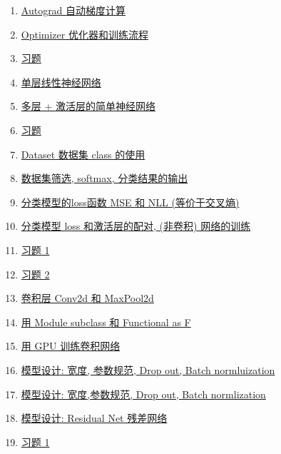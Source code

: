 \documentclass[11pt]{article}
\begin{document}
\begin{multicols}{2}
\begin{enumerate}
		\item \href{https://mp.weixin.qq.com/s/1araRBCpR6tGiV4cWTM2bA}{Autograd 自动梯度计算}	%
		\item \href{https://mp.weixin.qq.com/s/qNmnJ3EGPrczZNNZTH6yJQ}{Optimizer 优化器和训练流程}	%
		\item \href{https://mp.weixin.qq.com/s/7G8jrxUq-aMI7K3qTrD03A}{习题}	%
		\item \href{https://mp.weixin.qq.com/s/SEPqSD9W3HnEeuU6IcxQYQ}{单层线性神经网络}	%
		\item \href{https://mp.weixin.qq.com/s/0DHIJdzxWAgtusqxZqeg2g}{多层 + 激活层的简单神经网络}	%
		\item \href{https://mp.weixin.qq.com/s/2V68bVVr7Gi05LqOdHgsOw}{习题}	%
		\item \href{https://mp.weixin.qq.com/s/wcKFTXTyU9szEacaLhGOVw}{Dataset 数据集 class 的使用}	%
		\item \href{https://mp.weixin.qq.com/s/tpRiT0r6xMwzXLdo767r3g}{数据集筛选, softmax, 分类结果的输出}	%
		\item \href{https://mp.weixin.qq.com/s/BMEFM9wVRWp-maQJ7_6yTw}{分类模型的loss函数 MSE 和 NLL (等价于交叉熵) }	%
		\item \href{https://mp.weixin.qq.com/s/mZNcLjRIGuRSrwCxOIQYXg}{分类模型 loss 和激活层的配对, (非卷积) 网络的训练}	%
		\item \href{https://mp.weixin.qq.com/s/DWgyqaFd1L3tHoCsAqo1vQ}{习题 1}	%
		\item \href{https://mp.weixin.qq.com/s/DNTQYi2QUf60zEginb5JBw}{习题 2}	%
		\item \href{https://mp.weixin.qq.com/s/ofXwMlSUQXdFux9htN7vxw}{卷积层 Conv2d 和 MaxPool2d}	%
		\item \href{https://mp.weixin.qq.com/s/PPk6EJce2Yfd_jca-3vDng}{用 Module subclass 和 Functional as F}	%
		\item \href{https://mp.weixin.qq.com/s/TObOqNRdj6A88IQ7Oo--3Q}{用 GPU 训练卷积网络}	%
		\item \href{https://mp.weixin.qq.com/s/qZUymw_5mMcYokXEhejfhg}{模型设计: 宽度, 参数规范, Drop out, Batch normluization}	%
		\item \href{https://mp.weixin.qq.com/s/HI79ymNktyr3l77zzX53Og}{模型设计: 宽度,参数规范, Drop out, Batch normlization}	%
		\item \href{https://mp.weixin.qq.com/s/zodvZnERtHC226Dqr1C_dw}{模型设计: Residual Net 残差网络}	%
		\item \href{https://mp.weixin.qq.com/s/y2dBbP3hY0uNa_5bHY0XSQ}{习题 1}	%

\end{enumerate}
\end{multicols}
\end{document}
